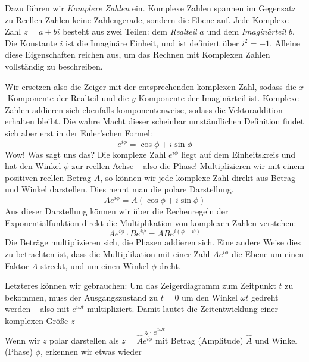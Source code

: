 
Dazu führen wir \emph{Komplexe Zahlen} ein. Komplexe Zahlen spannen im Gegensatz zu Reellen Zahlen keine Zahlengerade,
sondern die Ebene auf. Jede Komplexe Zahl $z = a+bi$ besteht aus zwei Teilen: dem \emph{Realteil} $a$ und dem
\emph{Imaginärteil} $b$. Die Konstante $i$ ist die Imaginäre Einheit, und ist definiert über $i^2 = -1$. Alleine diese
Eigenschaften reichen aus, um das Rechnen mit Komplexen Zahlen vollständig zu beschreiben.

Wir ersetzen also die Zeiger mit der entsprechenden komplexen Zahl, sodass die $x$-Komponente der Realteil und die
$y$-Komponente der Imaginärteil ist. Komplexe Zahlen addieren sich ebenfalls komponentenweise, sodass die Vektoraddition
erhalten bleibt. Die wahre Macht dieser scheinbar umständlichen Definition findet sich aber erst in der Euler'schen
Formel:
\begin{equation}\label{eq:euler}
    e^{i\phi} = \cos \phi + i\sin \phi
\end{equation}
Wow! Was sagt uns das? Die komplexe Zahl $e^{i\phi}$ liegt auf dem Einheitskreis und hat den Winkel $\phi$ zur reellen
Achse -- also die Phase! Multiplizieren wir mit einem positiven reellen Betrag $A$, so können wir jede komplexe Zahl direkt
aus Betrag und Winkel darstellen. Dies nennt man die polare Darstellung.
\begin{equation}\label{eq:polar}
    Ae^{i\phi} = A(\cos \phi + i\sin \phi)
\end{equation}
Aus dieser Darstellung können wir über die Rechenregeln der Exponentialfunktion direkt die Multiplikation von komplexen
Zahlen verstehen:
\[ Ae^{i\phi} \cdot Be^{i\psi} = ABe^{i(\phi+\psi)} \]
Die Beträge multiplizieren sich, die Phasen addieren sich. Eine andere Weise dies zu betrachten ist, dass die
Multiplikation mit einer Zahl $Ae^{i\phi}$ die Ebene um einen Faktor $A$ streckt, und um einen Winkel $\phi$ dreht.

Letzteres können wir gebrauchen: Um das Zeigerdiagramm zum Zeitpunkt $t$ zu bekommen, muss der Ausgangszustand zu $t=0$
um den Winkel $\omega t$ gedreht werden -- also mit $e^{i\omega t}$ multipliziert. Damit lautet die Zeitentwicklung
einer komplexen Größe $z$
\begin{equation}
    z\cdot e^{i\omega t}
\end{equation}
Wenn wir $z$ polar darstellen als $z = \hat A e^{i\phi}$ mit Betrag (Amplitude) $\hat A$ und Winkel (Phase) $\phi$, erkennen wir
etwas wieder

